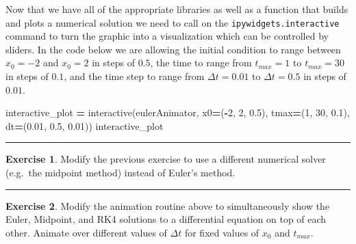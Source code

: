 \documentclass[
]{book}
\newenvironment{Shaded}{\begin{snugshade}}{\end{snugshade}}
\newcommand{\DecValTok}[1]{\textcolor[rgb]{0.00,0.00,0.81}{#1}}
\newcommand{\FloatTok}[1]{\textcolor[rgb]{0.00,0.00,0.81}{#1}}
\newcommand{\NormalTok}[1]{#1}
\newcommand{\OperatorTok}[1]{\textcolor[rgb]{0.81,0.36,0.00}{\textbf{#1}}}
\theoremstyle{definition}
\theoremstyle{definition}
\theoremstyle{definition}
\newtheorem{exercise}{Exercise}[chapter]
\theoremstyle{remark}
\begin{document}
Now that we have all of the appropriate libraries as well as a function that builds and plots a numerical solution we need to call on the \texttt{ipywidgets.interactive} command to turn the graphic into a visualization which can be controlled by sliders. In the code below we are allowing the initial condition to range between \(x_0 = -2\) and \(x_0 = 2\) in steps of \(0.5\), the time to range from \(t_{max}=1\) to \(t_{max}=30\) in steps of \(0.1\), and the time step to range from \(\Delta t = 0.01\) to \(\Delta t = 0.5\) in steps of \(0.01\).

\begin{Shaded}
\begin{Highlighting}[]
\NormalTok{interactive\_plot }\OperatorTok{=}\NormalTok{ interactive(eulerAnimator, }
\NormalTok{                               x0}\OperatorTok{=}\NormalTok{(}\OperatorTok{{-}}\DecValTok{2}\NormalTok{, }\DecValTok{2}\NormalTok{, }\FloatTok{0.5}\NormalTok{), }
\NormalTok{                               tmax}\OperatorTok{=}\NormalTok{(}\DecValTok{1}\NormalTok{, }\DecValTok{30}\NormalTok{, }\FloatTok{0.1}\NormalTok{), }
\NormalTok{                               dt}\OperatorTok{=}\NormalTok{(}\FloatTok{0.01}\NormalTok{, }\FloatTok{0.5}\NormalTok{, }\FloatTok{0.01}\NormalTok{))}
\NormalTok{interactive\_plot}
\end{Highlighting}
\end{Shaded}

\begin{center}\rule{0.5\linewidth}{0.5pt}\end{center}

\begin{exercise}
\protect\hypertarget{exr:unnamed-chunk-467}{}{\label{exr:unnamed-chunk-467} }Modify the previous exercise to use a different numerical solver (e.g.~the midpoint method) instead of Euler's method.
\end{exercise}

\begin{center}\rule{0.5\linewidth}{0.5pt}\end{center}

\begin{exercise}
\protect\hypertarget{exr:unnamed-chunk-468}{}{\label{exr:unnamed-chunk-468} }Modify the animation routine above to simultaneously show the Euler, Midpoint, and RK4 solutions to a differential equation on top of each other. Animate over different values of \(\Delta t\) for fixed values of \(x_0\) and \(t_{max}\).
\end{exercise}
\end{document}
